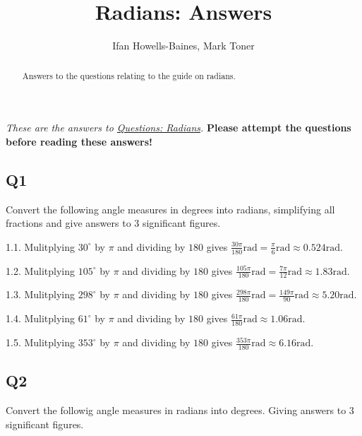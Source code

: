 \documentclass[
  12pt,
  a4paper, oneside]{starmastarticle}
\title{Radians: Answers}
\author{Ifan Howells-Baines, Mark Toner}
\date{}
\begin{document}
\maketitle
\begin{abstract}
Answers to the questions relating to the guide on radians.
\end{abstract}
\ifdefined\Shaded\renewenvironment{Shaded}{\begin{tcolorbox}[breakable, frame hidden, boxrule=0pt, enhanced, sharp corners, interior hidden, borderline west={3pt}{0pt}{shadecolor}]}{\end{tcolorbox}}\fi

\emph{These are the answers to \href{qs-radians.qmd}{Questions:
Radians}.} \textbf{Please attempt the questions before reading these
answers!}

\hypertarget{q1}{%
\subsection*{Q1}\label{q1}}

Convert the following angle measures in degrees into radians,
simplifying all fractions and give answers to \(3\) significant figures.

1.1. Mulitplying \(30 ^\circ\) by \(\pi\) and dividing by \(180\) gives
\(\frac{30\pi}{180} \textrm{rad} = \frac{\pi}{6} \textrm{rad} \approx 0.524 \textrm{rad}\).

1.2. Mulitplying \(105^\circ\) by \(\pi\) and dividing by \(180\) gives
\(\frac{105\pi}{180} \textrm{rad} = \frac{7\pi}{12} \textrm{rad} \approx 1.83 \textrm{rad}\).

1.3. Mulitplying \(298^\circ\) by \(\pi\) and dividing by \(180\) gives
\(\frac{298\pi}{180} \textrm{rad} = \frac{149\pi}{90} \textrm{rad} \approx 5.20 \textrm{rad}\).

1.4. Mulitplying \(61^\circ\) by \(\pi\) and dividing by \(180\) gives
\(\frac{61\pi}{180} \textrm{rad} \approx 1.06 \textrm{rad}\).

1.5. Mulitplying \(353^\circ\) by \(\pi\) and dividing by \(180\) gives
\(\frac{353\pi}{180} \textrm{rad} \approx 6.16 \textrm{rad}\).

\hypertarget{q2}{%
\subsection*{Q2}\label{q2}}

Convert the followig angle measures in radians into degrees. Giving
answers to \(3\) significant figures.
\end{document}
